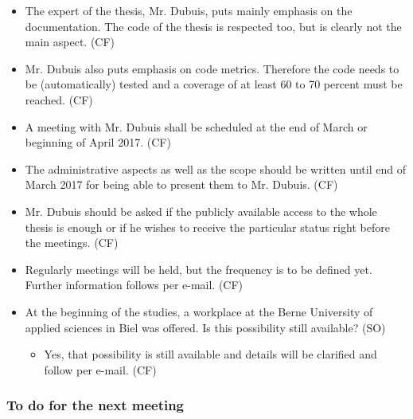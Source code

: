 \documentclass[10pt, openright, notitlepage]{scrreprt}
\begin{document}
\begin{itemize}
\item The expert of the thesis, Mr. Dubuis, puts mainly emphasis on the
documentation. The code of the thesis is respected too, but is clearly not the
main aspect. (CF)
\item Mr. Dubuis also puts emphasis on code metrics. Therefore the code needs to be
(automatically) tested and a coverage of at least 60 to 70 percent must be
reached. (CF)
\item A meeting with Mr. Dubuis shall be scheduled at the end of March or beginning
of April 2017. (CF)
\item The administrative aspects as well as the scope should be written until end of
March 2017 for being able to present them to Mr. Dubuis. (CF)
\item Mr. Dubuis should be asked if the publicly available access to the whole
thesis is enough or if he wishes to receive the particular status right before
the meetings. (CF)
\item Regularly meetings will be held, but the frequency is to be defined yet.
Further information follows per e-mail. (CF)
\item At the beginning of the studies, a workplace at the Berne University of
applied sciences in Biel was offered. Is this possibility still available?
(SO)
\begin{itemize}
\item Yes, that possibility is still available and details will be clarified and
follow per e-mail. (CF)
\end{itemize}
\end{itemize}

\subsubsection{To do for the next meeting}
\label{sec:org5a95893}
\end{document}
